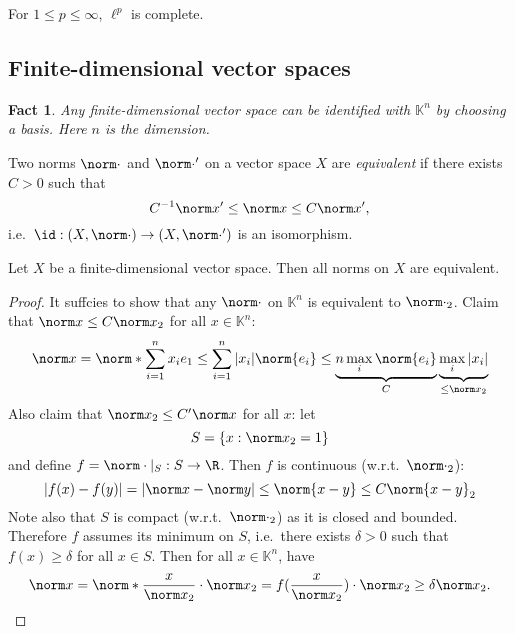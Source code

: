 \documentclass[a4paper]{article}
\newtheorem*{fact}{Fact}
\newcommand{\K}{{\mathbb{K}}} %
\begin{document}
\begin{corollary}
  For \(1 \leq p \leq \infty\), \(\ell^p\) is complete.
\end{corollary}

\subsection{Finite-dimensional vector spaces}

\begin{fact}
  Any finite-dimensional vector space can be identified with \(\K^n\) by choosing a basis. Here \(n\) is the dimension.
\end{fact}

\begin{definition}[equivalent]
  Two norms \(\norm \cdot\) and \(\norm \cdot'\) on a vector space \(X\) are \emph{equivalent} if there exists \(C > 0\) such that
  \[
    C^{-1} \norm x' \leq \norm x \leq C \norm x',
  \]
  i.e.\ \(\id: (X, \norm \cdot) \to (X, \norm \cdot ')\) is an isomorphism.
\end{definition}

\begin{theorem}
  Let \(X\) be a finite-dimensional vector space. Then all norms on \(X\) are equivalent.
\end{theorem}

\begin{proof}
  It suffcies to show that any \(\norm \cdot\) on \(\K^n\) is equivalent to \(\norm \cdot_2\). Claim that \(\norm x \leq C \norm x_2\) for all \(x \in \K^n\):
  \[
    \norm x
    = \norm*{\sum_{i = 1}^n x_i e_1}
    \leq \sum_{i = 1}^n |x_i| \norm{e_i}
    \leq \underbrace{n \max_i \norm{e_i}}_{C} \underbrace{\max_i|x_i|}_{\leq \norm x_2}
  \]
  Also claim that \(\norm x_2 \leq C' \norm x\) for all \(x\): let
  \[
    S = \{x: \norm x_2 = 1\}
  \]
  and define \(f = \norm \cdot |_S: S \to \R\). Then \(f\) is continuous (w.r.t.\ \(\norm \cdot_2\)):
  \[
    |f(x) - f(y)|
    = |\norm x - \norm y|
    \leq \norm{x - y}
    \leq C\norm{x - y}_2
  \]
  Note also that \(S\) is compact (w.r.t.\ \(\norm \cdot_2\)) as it is closed and bounded. Therefore \(f\) assumes its minimum on \(S\), i.e.\ there exists \(\delta > 0\) such that \(f(x) \geq \delta\) for all \(x \in S\). Then for all \(x \in \K^n\), have
  \[
    \norm x = \norm*{\frac{x}{\norm x_2}} \cdot \norm x_2 = f(\frac{x}{\norm x_2}) \cdot \norm x_2
    \geq \delta \norm x_2.
  \]
\end{proof}
\end{document}
